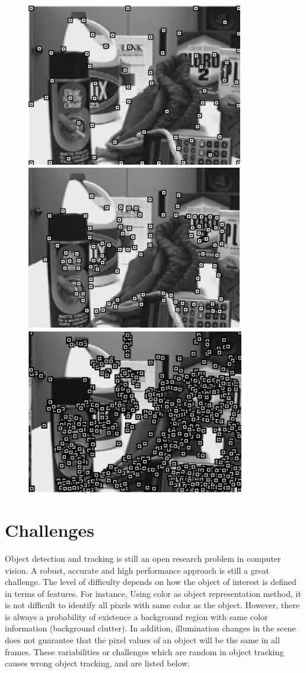 \begin{figure}[h!!]
\centering
{
\includegraphics[width=0.32\linewidth]{Figures/points/harris.png}
\includegraphics[width=0.32\linewidth]{Figures/points/klt.png}
\includegraphics[width=0.32\linewidth]{Figures/points/sift.png}
}	
\end{figure}

\section{Challenges}

Object detection and tracking is still an open research problem in computer vision. A robust, accurate and high performance approach is still a great challenge. The level of difficulty depends on how the object of interest is defined in terms of features. For instance, Using color as object representation method, it is not difficult to identify all pixels with same color as the object. However, there is always a probability of existence a background region with same color information (background clutter). In addition, illumination changes in the scene does not guarantee that the pixel values of an object will be the same in all frames. These variabilities or challenges which are random in object tracking causes wrong object tracking, and are listed below.

